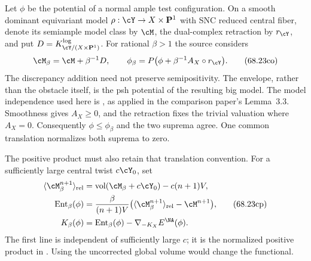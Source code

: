 Let $\phi$ be the potential of a normal ample test configuration.
On a smooth dominant equivariant model $\rho:\cY\to X\times\mathbf P^1$
with SNC reduced central fiber, denote its semiample model class by
$\cM$, the dual-complex retraction by $r_{\cY}$, and put
$D=K^{\log}_{\cY/(X\times\mathbf P^1)}$.
For rational $\beta>1$ the source considers
\[
 \cM_\beta=\cM+\beta^{-1}D,
 \qquad
 \phi_\beta=P\bigl(\phi+\beta^{-1}A_X\circ r_{\cY}\bigr).
\tag{68.23co}\label{eq:ytd-Khat-Kbeta-obstacle}
\]
The discrepancy addition need not preserve semipositivity.
The envelope, rather than the obstacle itself, is the psh potential
of the resulting big model. The model independence used here is
\cite[Lemma~9.1 and Remark~9.2]{DarvasZhang25YTD},
as applied in the comparison paper's Lemma~3.3.
Smoothness gives $A_X\geq0$, and the retraction fixes the trivial
valuation where $A_X=0$. Consequently
$\phi\leq\phi_\beta$ and the two suprema agree.
One common translation normalizes both suprema to zero.

The positive product must also retain that translation convention.
For a sufficiently large central twist $c\cY_0$, set
\[
 \begin{aligned}
 \langle\cM_\beta^{n+1}\rangle_{\mathrm{rel}}
     &=\operatorname{vol}(\cM_\beta+c\cY_0)-c(n+1)V,\\
 \operatorname{Ent}_\beta(\phi)
     &=\frac{\beta}{(n+1)V}
       \bigl(\langle\cM_\beta^{n+1}\rangle_{\mathrm{rel}}
                                      -\cM^{n+1}\bigr),\\
 K_\beta(\phi)
     &=\operatorname{Ent}_\beta(\phi)
                                      -\nabla_{-K_X}E^{\NA}(\phi).
 \end{aligned}
\tag{68.23cp}\label{eq:ytd-Khat-Kbeta-relative-volume}
\]
The first line is independent of sufficiently large $c$;
it is the normalized positive product in
\cite[equation~(62)]{DarvasZhang25YTD}.
Using the uncorrected global volume would change the functional.

